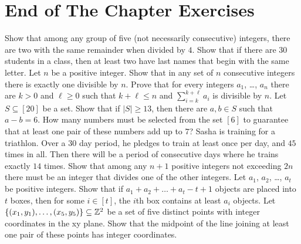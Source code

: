 \section*{End of The Chapter Exercises}
\begin{exercises}
  \exerciseitem Show that among any group of five (not necessarily consecutive)
    integers, there are two with the same remainder when divided by $4$.
  \exerciseitem Show that if there are 30 students in a class, then at least
    two have last names that begin with the same letter.
  \exerciseitem Let $n$ be a positive integer. Show that in any set of $n$
    consecutive integers there is exactly one divisible by $n$.
  \exerciseitem Prove that for every integers $a_1$, \dots, $a_n$ there are
    $k > 0$ and $\ell \ge 0$ such that $k + \ell \le n$ and
    $\sum\limits_{i = k}^{k + \ell} a_i$ is divisible by $n$.
  \exerciseitem Let $S \subseteq [20]$ be a set. Show that if
    $|S| \ge 13$, then there are $a, b \in S$ such that $a - b = 6$.
  \exerciseitem How many numbers must be selected from the set $[6]$ to
    guarantee that at least one pair of these numbers add up to $7$?
  \exerciseitem Sasha is training for a triathlon. Over a $30$ day period, he
    pledges to train at least once per day, and $45$ times in all. Then there
    will be a period of consecutive days where he trains exactly $14$ times.
  \exerciseitem Show that among any $n + 1$ positive integers not exceeding $2n$
    there must be an integer that divides one of the other integers.
  \exerciseitem Let $a_1$, $a_2$, \dots, $a_t$ be positive integers. Show that
    if $a_1 + a_2 + \dots + a_t - t + 1$ objects are placed into $t$ boxes,
    then for some $i \in [t]$, the $i$th box contains at least $a_i$ objects.
  \exerciseitem Let $\set{(x_1,y_1), \dots, (x_5, y_5)} \subseteq \Z^2$ be a
    set of five distinct points with integer coordinates in the xy plane. Show
    that the midpoint of the line joining at least one pair of these points has
    integer coordinates.
\end{exercises}

